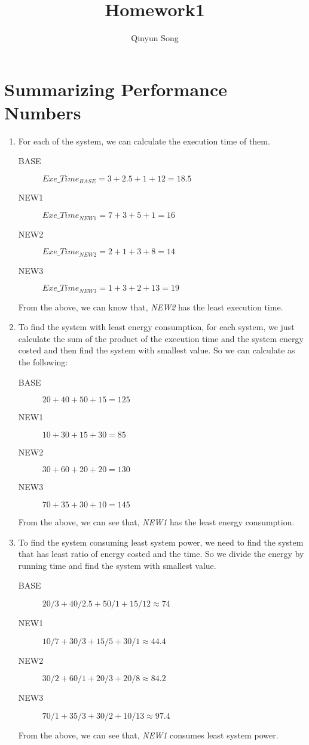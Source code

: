 \documentclass{article}
\title{Homework1}
\author{Qinyun Song}
\date{}
\begin{document}
	\maketitle

	\section{Summarizing Performance Numbers}
	\begin{enumerate}
		\item For each of the system, we can calculate the execution time of them. \begin{description}
			\item[BASE] 
				$Exe\_Time_{BASE} = 3 + 2.5 + 1 + 12 = 18.5$
			\item[NEW1] 
				$Exe\_Time_{NEW1} = 7 + 3 + 5 + 1 = 16$ 
			\item[NEW2]
				$Exe\_Time_{NEW2} = 2 + 1 + 3 + 8 = 14$
			\item[NEW3]
				$Exe\_Time_{NEW3} = 1 + 3 + 2 + 13 = 19$
		\end{description}
		From the above, we can know that, \emph{NEW2} has the least execution time.
		\item To find the system with least energy consumption, for each system, we just calculate the sum of the product of the execution time and the system energy costed and then find the system with smallest value. So we can calculate as the following: \begin{description}
			\item[BASE] $20 + 40 + 50 + 15 = 125$
			\item[NEW1] $10 + 30 + 15 + 30 = 85 $
			\item[NEW2] $30 + 60 + 20 + 20 = 130$
			\item[NEW3] $70 + 35 + 30 + 10 = 145$
		\end{description}
		From the above, we can see that, \emph{NEW1} has the least energy consumption.
		\item To find the system consuming least system power, we need to find the system that has least ratio of energy costed and the time. So we divide the energy by running time and find the system with smallest value. \begin{description}
			\item[BASE] $20 /3 + 40 / 2.5 + 50 / 1 + 15 / 12 \approx 74 $
			\item[NEW1] $10 / 7 + 30 / 3 + 15 / 5 + 30 / 1 \approx 44.4 $
			\item[NEW2] $30 / 2 + 60 /1 + 20 / 3 + 20 / 8 \approx 84.2 $
			\item[NEW3] $70 / 1 + 35 / 3 + 30 / 2 + 10 / 13 \approx 97.4$
		\end{description}
		From the above, we can see that, \emph{NEW1} consumes least system power.
	\end{enumerate}
\end{document}
